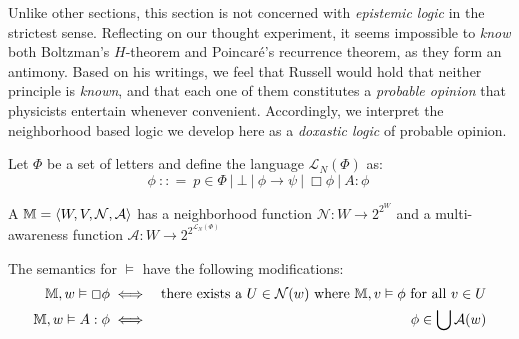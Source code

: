 Unlike other sections, this section is not concerned with \emph{epistemic logic} in the strictest sense. 
Reflecting on our thought experiment, it seems impossible to \emph{know} both
Boltzman's $H$-theorem and Poincar\'{e}'s recurrence theorem, as they
form an antimony.  Based on his writings, we feel that Russell would
hold that neither principle is \emph{known}, and that each one of them
constitutes a \emph{probable
  opinion}\cite[pgs. 63--67]{russell_problems_1936} 
that physicists entertain whenever convenient.  
Accordingly, we interpret the neighborhood based logic we 
develop here as a \emph{doxastic logic} of probable opinion.

\begin{definition}
  Let $\Phi$ be a set of letters and define the language $\mathcal{L}_N (\Phi)$ as:
  \[ \phi\ : : =\ p \in \Phi\ |
    \ \bot\ |\ \phi \rightarrow \psi
    \ |\ \Box \phi\ |\ A :
     \phi\  \]
\end{definition}


\begin{definition}
  \label{neighborhoodmodels}A {} $\mathbbm{M}=
  \langle W, V, \mathcal{N}, \mathcal{A} \rangle$ has a neighborhood function
  $\mathcal{N} : W \rightarrow 2^{2^W}$ and a multi-awareness function $\mathcal{A} : W \rightarrow 2^{2^{\mathcal{L}_N (\Phi)}}$
    
  The semantics for $\vDash$ have the following modifications:
  \begin{eqnarray*}
    \mathbbm{M}, w \vDash \Box \phi & \iff & \text{there exists a $U \in
    \mathcal{N}(w)$ where $\mathbbm{M}, v \vDash \phi$ for all $v \in U$}\\
    \mathbbm{M}, w \vDash A : \phi & \iff & \phi \in \bigcup
    \mathcal{A}(w)
  \end{eqnarray*}
\end{definition}


